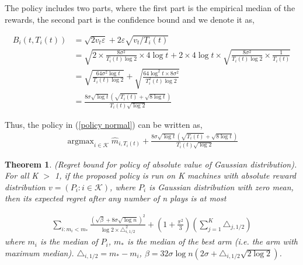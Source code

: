 \documentclass{article}
\DeclareMathOperator*{\argmax}{argmax}
\theoremstyle{plain}
\newtheorem{theo}{Theorem}
\begin{document}
The policy includes two parts, where the first part is the empirical median of the rewards, the second part is the confidence bound and we denote it as,

\begin{align}
\label{B_i(i, T_i(t)) definition}
B_i(t, T_i(t)) &= \sqrt{2v_t \varepsilon} + 2 \varepsilon \sqrt{v_t/T_i(t)}\\
&= \sqrt{2 \times \frac{8\sigma^2}{T_i(t)  \log 2} \times 4 \log t} + 2 \times 4 \log t \times \sqrt{\frac{8\sigma^2}{T_i(t)  \log 2} \times \frac{1}{T_i(t)}}\\
&= \sqrt{\frac{64 \sigma^2 \log t  }{T_i(t) \log 2}} + \sqrt{\frac{64 \log^2 t \times 8 \sigma^2}{T_i^2(t) \log 2}}\\
\label{B_i(i, T_i(t)) definition 2}
&= \frac{8 \sigma \sqrt{\log t} (\sqrt{ T_i(t)} + \sqrt{8\log t})}{ T_i(t)  \sqrt{\log 2}}
\end{align}

Thus, the policy in (\ref{policy normal}) can be written as,
\begin{align}
    \argmax_{i \in \mathcal{K}} \hat{m}_{i, T_i(t)} + \frac{8 \sigma \sqrt{\log t} (\sqrt{ T_i(t)} + \sqrt{8\log t})}{ T_i(t)  \sqrt{\log 2}}
\end{align}

\begin{theo}
(Regret bound for policy of absolute value of Gaussian distribution). \\

For all K $>$ 1, if the proposed policy is run on K machines with absolute reward distribution $v = (P_i: i \in \mathcal{K})$, where $P_i$ is Gaussian distribution with zero mean, then its expected regret after any number of n plays is at most 

\begin{align}
    \sum_{i: m_i < m_\ast} \frac{(\sqrt{\beta} + 8 \sigma \sqrt{\log n})^2}{\log 2 \times \triangle_{i, 1/2}^2}  + (1 + \frac{\pi^2}{3}) (\sum_{j=1}^K \triangle_{j, 1/2}) 
\end{align}
where $m_i$ is the median of $P_i$, $m_\ast$ is the median of the best arm (i.e. the arm with maximum median). $\triangle_{i, 1/2} = m_\ast - m_i$, $\beta = 32 \sigma \log n (2 \sigma + \triangle_{i,1/2} \sqrt{2 \log 2} )$. 
\end{theo}
\end{document}
